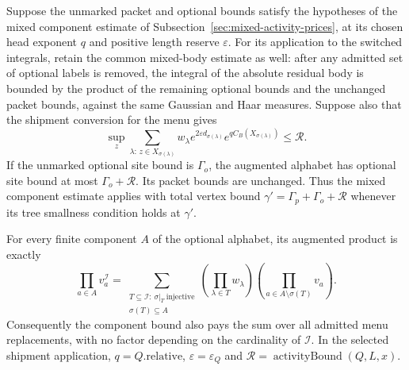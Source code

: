\begin{lemma}
\label{lem:selected-menu-alphabet}
Suppose the unmarked packet and optional bounds satisfy the hypotheses
of the mixed component estimate of
Subsection~\ref{sec:mixed-activity-prices}, at its chosen head exponent
$q$ and positive length reserve $\varepsilon$. For its application to
the switched integrals, retain the common mixed-body estimate as well:
after any admitted set of optional labels is removed, the integral of
the absolute residual body is bounded by the product of the remaining
optional bounds and the unchanged packet bounds, against the same
Gaussian and Haar measures. Suppose also that the
shipment conversion for the menu gives
\begin{equation}\label{eq:selected-menu-extra-hit}
 \sup_z\sum_{\lambda:\,z\in X_{\sigma(\lambda)}}
 w_\lambda e^{2\varepsilon d_{\sigma(\lambda)}}
 e^{q C_B(X_{\sigma(\lambda)})}\le\mathcal R.
\end{equation}
If the unmarked optional site bound is $\Gamma_o$, the augmented
alphabet has optional site bound at most $\Gamma_o+\mathcal R$.
Its packet bounds are unchanged. Thus the mixed component estimate
applies with total vertex bound
$\gamma'=\Gamma_p+\Gamma_o+\mathcal R$ whenever its tree smallness
condition holds at $\gamma'$.

For every finite component $A$ of the optional alphabet, its augmented
product is exactly
\begin{equation}\label{eq:selected-menu-ticket-product}
 \prod_{a\in A}v_a^{\mathcal I}
 =\sum_{\substack{T\subseteq\mathcal I:\ \sigma|_T\ \text{injective}\\
                                  \sigma(T)\subseteq A}}
       \left(\prod_{\lambda\in T}w_\lambda\right)
       \left(\prod_{a\in A\setminus\sigma(T)}v_a\right).
\end{equation}
Consequently the component bound also pays the sum over all admitted
menu replacements, with no factor depending on the cardinality of
$\mathcal I$. In the selected shipment application,
$q=Q.\mathrm{relative}$, $\varepsilon=\varepsilon_Q$ and
$\mathcal R=\operatorname{activityBound}(Q,L,x)$.
\end{lemma}

